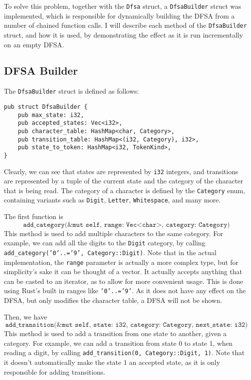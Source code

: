 \documentclass{article}
\newcommand{\code}[1]{\texttt{#1}}
\begin{document}
To solve this problem, together with the \code{Dfsa} struct, a
\code{DfsaBuilder} struct was implemented, which is responsible for dynamically
building the DFSA from a number of chained function calls. I will describe each
method of the \code{DfsaBuilder} struct, and how it is used, by demonstrating
the effect as it is run incrementally on an empty DFSA.

\newpage

\subsection{DFSA Builder}

The \code{DfsaBuilder} struct is defined as follows:

\begin{mainbox}{}
    \lstset{xleftmargin=0cm}
    \begin{lstlisting}
pub struct DfsaBuilder {
    pub max_state: i32,
    pub accepted_states: Vec<i32>,
    pub character_table: HashMap<char, Category>,
    pub transition_table: HashMap<(i32, Category), i32>,
    pub state_to_token: HashMap<i32, TokenKind>,
}
    \end{lstlisting}
\end{mainbox}

Clearly, we can see that states are represented by \code{i32} integers, and
transitions are represented by a tuple of the current state and the category of
the character that is being read. The category of a character is defined by the
\code{Category} enum, containing variants such as \code{Digit}, \code{Letter},
\code{Whitespace}, and many more.


The first function is $$\code{add\_category(\&mut self, range: Vec<char>,
        category: Category)}$$  This method is used to add multiple characters to the
same category.  For example, we can add all the digits to the \code{Digit}
category, by calling \code{add\_category('0'..='9', Category::Digit)}. Note that
in the actual implementation, the \code{range} parameter is actually a more
complex type, but for simplicity's sake it can be thought of a vector. It
actually accepts anything that can be casted to an iterator, as to allow for
more convenient usage. This is done using Rust's built in ranges like
\code{'0'..='9'}. As it does not have any effect on the DFSA, but only modifies
the character table, a DFSA will not be shown.

Then, we have $$\code{add\_transition(\&mut self, state: i32, category:
        Category, next\_state: i32)}$$ This method is used to add a transition from one
state to another, given a category. For example, we can add a transition from
state 0 to state 1, when reading a digit, by calling \code{add\_transition(0,
    Category::Digit, 1)}. Note that it doesn't automatically make the state 1 an
accepted state, as it is only responsible for adding transitions.
\end{document}
